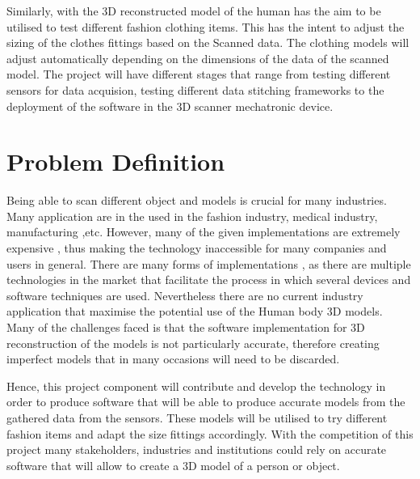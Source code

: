 \documentclass[12pt]{report}
\begin{document}
Similarly, with the 3D reconstructed model of the human has the aim to be utilised to test different fashion clothing items. This has the intent to adjust the sizing of the clothes fittings based on the Scanned data. The clothing models will adjust automatically depending on the dimensions of the data of the scanned model. 
The project will have different stages that range from testing different sensors for data acquision, testing different data stitching frameworks to the deployment of the software in the 3D scanner mechatronic device. 

\section{Problem Definition}
Being able to scan different object and models is crucial for many industries. Many application are in the used in the fashion industry, medical industry, manufacturing ,etc. However, many of the given implementations are extremely expensive , thus making the technology inaccessible for many companies and users in general. 
There are many forms of implementations , as there are multiple technologies  in the market that facilitate the process in which several devices and software techniques are used. Nevertheless there are no current industry application that maximise the potential use of the Human body 3D models.
Many of the challenges faced is that the software implementation for 3D reconstruction of the models is not particularly accurate, therefore creating imperfect models that in many occasions will need to be discarded.

Hence, this project component will contribute and develop the technology in order to produce software that will be able to produce accurate models from the gathered data from the sensors. These models will be utilised to try different fashion items and adapt the size fittings accordingly. 
With the competition of this project many stakeholders, industries and institutions could rely on  accurate software that will  allow to create a 3D model of a person or object.
\end{document}
